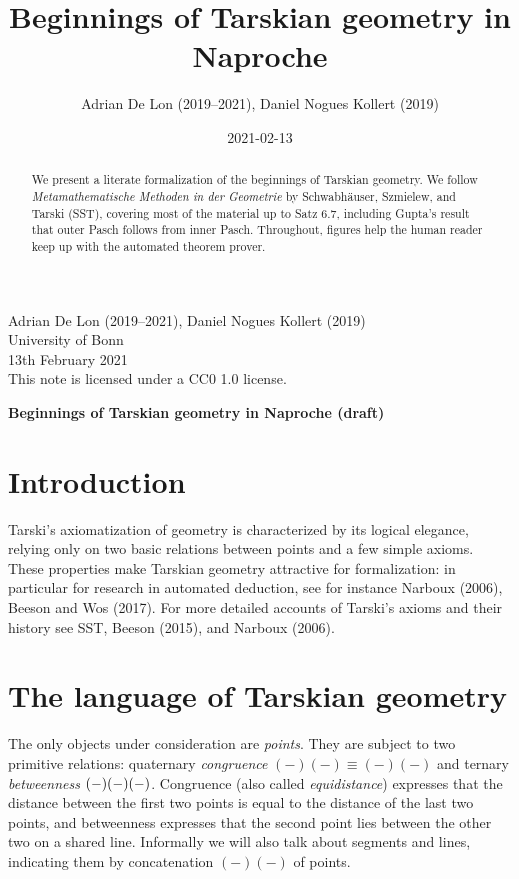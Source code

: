\documentclass[10pt,a4paper,parskip=half,numbers=endperiod,parskip]{scrartcl}
\title{Beginnings of Tarskian geometry in Naproche}
\author{Adrian De Lon (2019--2021), Daniel Nogues Kollert (2019)}
\date{2021-02-13}
\begin{document}
  \begin{flushleft}
    Adrian De Lon (2019--2021), Daniel Nogues Kollert (2019)
    \\ University of Bonn
    \\ 13th February 2021
    \\ This note is licensed under a {CC0 1.0} license.
  \end{flushleft}

  \vspace*{2\baselineskip}

  {\large\bfseries\sffamily Beginnings of Tarskian geometry in Naproche (draft)}


  \begin{abstract}
    We present a %
    literate formalization of the beginnings of Tarskian geometry.
    We follow
    \textit{Metamathematische Methoden in der Geometrie}
    by Schwabhäuser, Szmielew, and Tarski ({SST}),
    covering most of the material up to Satz 6.7\kern-1pt,
including Gupta's result that outer Pasch follows from inner Pasch.
    Throughout, figures help the human reader keep up with the automated theorem prover.
  \end{abstract}

  \section{Introduction}

  Tarski's axiomatization of geometry is characterized by its logical elegance, relying only on two basic relations between points
  and a few simple axioms.
  These properties make Tarskian geometry attractive for formalization:
  in particular for research in automated deduction, see for instance Narboux (2006), Beeson and Wos (2017).
  For more detailed accounts of Tarski's axioms and their history see
  {SST}, Beeson (2015), and Narboux (2006).

  \section{The language of Tarskian geometry}

  The only objects under consideration are \textit{points}.
  They are subject to two primitive relations:
  quaternary \textit{congruence} ${(-)}{(-)}{\equiv}{(-)}{(-)}$
  and ternary \textit{betweenness} $(-) (-) (-)$.
  Congruence (also called \textit{equidistance}) expresses that the distance between the first two points is equal to the distance of the last two points, and betweenness expresses that
  the second point lies between the other two on a shared line.
  Informally we will also talk about segments and lines,
  indicating them by concatenation $(-)(-)$ of points.
\end{document}

